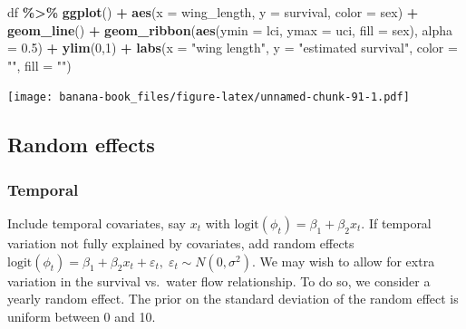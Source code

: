 \documentclass[
  12pt,
]{krantz}
\newenvironment{Shaded}{\begin{snugshade}}{\end{snugshade}}
\newcommand{\AttributeTok}[1]{\textcolor[rgb]{0.13,0.29,0.53}{#1}}
\newcommand{\DecValTok}[1]{\textcolor[rgb]{0.00,0.00,0.81}{#1}}
\newcommand{\FloatTok}[1]{\textcolor[rgb]{0.00,0.00,0.81}{#1}}
\newcommand{\FunctionTok}[1]{\textcolor[rgb]{0.13,0.29,0.53}{\textbf{#1}}}
\newcommand{\NormalTok}[1]{#1}
\newcommand{\SpecialCharTok}[1]{\textcolor[rgb]{0.81,0.36,0.00}{\textbf{#1}}}
\newcommand{\StringTok}[1]{\textcolor[rgb]{0.31,0.60,0.02}{#1}}
\begin{document}
\begin{Shaded}
\begin{Highlighting}[]
\NormalTok{df }\SpecialCharTok{\%\textgreater{}\%}
  \FunctionTok{ggplot}\NormalTok{() }\SpecialCharTok{+} 
  \FunctionTok{aes}\NormalTok{(}\AttributeTok{x =}\NormalTok{ wing\_length, }\AttributeTok{y =}\NormalTok{ survival, }\AttributeTok{color =}\NormalTok{ sex) }\SpecialCharTok{+} 
  \FunctionTok{geom\_line}\NormalTok{() }\SpecialCharTok{+} 
  \FunctionTok{geom\_ribbon}\NormalTok{(}\FunctionTok{aes}\NormalTok{(}\AttributeTok{ymin =}\NormalTok{ lci, }\AttributeTok{ymax =}\NormalTok{ uci, }\AttributeTok{fill =}\NormalTok{ sex), }\AttributeTok{alpha =} \FloatTok{0.5}\NormalTok{) }\SpecialCharTok{+} 
  \FunctionTok{ylim}\NormalTok{(}\DecValTok{0}\NormalTok{,}\DecValTok{1}\NormalTok{) }\SpecialCharTok{+} 
  \FunctionTok{labs}\NormalTok{(}\AttributeTok{x =} \StringTok{"wing length"}\NormalTok{, }\AttributeTok{y =} \StringTok{"estimated survival"}\NormalTok{, }\AttributeTok{color =} \StringTok{""}\NormalTok{, }\AttributeTok{fill =} \StringTok{""}\NormalTok{)}
\end{Highlighting}
\end{Shaded}

\texttt{[image: banana-book\_files/figure-latex/unnamed-chunk-91-1.pdf]}

\hypertarget{random-effects}{%
\subsection{Random effects}\label{random-effects}}

\hypertarget{temporal}{%
\subsubsection{Temporal}\label{temporal}}

Include temporal covariates, say \(x_t\) with \(\text{logit}(\phi_t) = \beta_1 + \beta_2 x_t\). If temporal variation not fully explained by covariates, add random effects \(\text{logit}(\phi_t) = \beta_1 + \beta_2 x_t + \varepsilon_t, \; \varepsilon_t \sim N(0,\sigma^2)\). We may wish to allow for extra variation in the survival vs.~water flow relationship. To do so, we consider a yearly random effect. The prior on the standard deviation of the random effect is uniform between 0 and 10.
\end{document}
